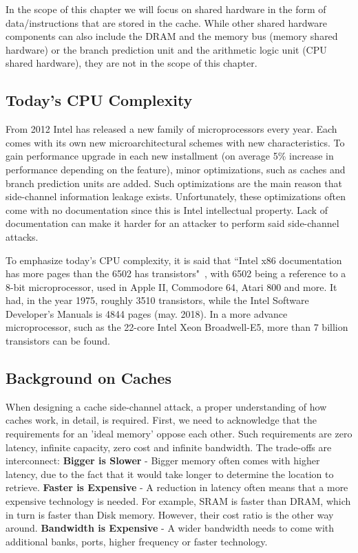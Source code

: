 In the scope of this chapter we will focus on shared hardware in the form of
data/instructions that are stored in the cache. While other shared hardware components can also include
the DRAM and the memory bus (memory shared hardware) or the branch prediction
unit and the arithmetic logic unit (CPU shared hardware), they are not in the
scope of this chapter.

\subsection{Today's CPU Complexity}
\label{subsec:todaycpucomplex}
From 2012 Intel has released a new family of microprocessors every year.
Each comes with its own new microarchitectural schemes with new characteristics.
To gain performance upgrade in each new installment (on average 5\%
increase in performance depending on the feature), minor optimizations, such
as caches and branch prediction units are added. Such optimizations are the main reason that side-channel information leakage exists. Unfortunately, these
optimizations often come with no documentation since this is Intel intellectual
property. Lack of documentation can make it harder for an attacker to perform
said side-channel attacks.

To emphasize today's CPU complexity, it is said that ``Intel x86 documentation
has more pages than the 6502 has transistors"~\cite{IntMan}, with 6502 being a
reference to a 8-bit microprocessor, used in Apple II, Commodore 64, Atari 800
and more. It had, in the year 1975, roughly 3510 transistors, while the Intel
Software Developer's Manuals is 4844 pages (may. 2018). In a more advance
microprocessor, such as the 22-core Intel Xeon Broadwell-E5, more than 7 billion
transistors can be found. 

\subsection{Background on Caches}
\label{subsec:backgroundoncaches}
When designing a cache side-channel attack, a proper understanding of how caches
work, in detail, is required. First, we need to acknowledge that the
requirements for an 'ideal memory' oppose each other. Such requirements are zero
latency, infinite capacity, zero cost and infinite bandwidth. The trade-offs are
interconnect: \textbf{Bigger is Slower} - Bigger memory often comes with higher
latency, due to the fact that it would take longer to determine the location to
retrieve.  \textbf{Faster is Expensive} - A reduction in latency often means
that a more expensive technology is needed. For example, SRAM is faster than
DRAM, which in turn is faster than Disk memory. However, their cost ratio is the
other way around. \textbf{Bandwidth is Expensive} - A wider bandwidth needs to
come with additional banks, ports, higher frequency or faster technology. 

